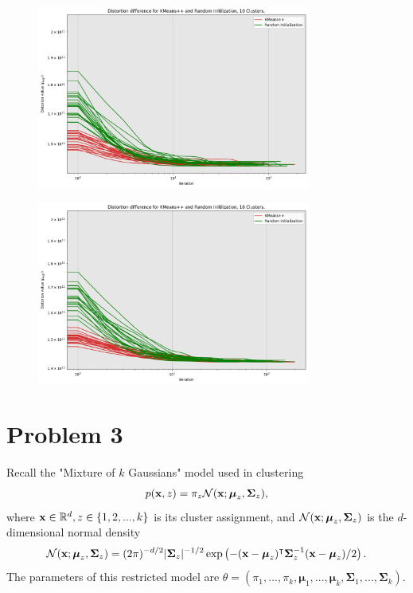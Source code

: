 \begin{figure}
    \centering
    \includegraphics[width = 0.8\textwidth]{Figure/10clustersmnist.png}
\end{figure}

\begin{figure}
    \centering
    \includegraphics[width = 0.8\textwidth]{Figure/16clustersmnist.png}
\end{figure}

\clearpage


\newpage
\section{Problem 3}
Recall the "Mixture of $k$ Gaussians" model used in clustering
\begin{align}
    p(\textbf{x}, z) = \pi_z \mathcal{N} (\textbf{x};\boldsymbol{\mu}_z, \boldsymbol{\Sigma}_z), \label{Gauss}
\end{align}
where $\textbf{x} \in \mathbb{R}^d, z \in \{1, 2, ..., k\}$ is its cluster assignment, and $\mathcal{N} (\textbf{x};\boldsymbol{\mu}_z, \boldsymbol{\Sigma}_z)$ is the $d$-dimensional normal density
\[\mathcal{N} (\textbf{x};\boldsymbol{\mu}_z, \boldsymbol{\Sigma}_z) = (2\pi)^{-d/2} |\boldsymbol{\Sigma}_z|^{-1/2} \exp \left( -(\textbf{x} - \boldsymbol{\mu}_z)^{\intercal} \boldsymbol{\Sigma}_z^{-1} (\textbf{x} - \boldsymbol{\mu}_z) / 2\right).\]
The parameters of this restricted model are $\theta = (\pi_1, ..., \pi_k, \boldsymbol{\mu}_1, ..., \boldsymbol{\mu}_k, \boldsymbol{\Sigma}_1, ..., \boldsymbol{\Sigma}_k).$

